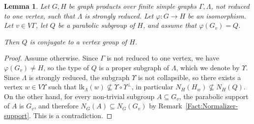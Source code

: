 \documentclass[a4paper,english,11pt]{article}
\newtheorem{lemma}[de]{Lemma}
\theoremstyle{definition}
\theoremstyle{remark}
\newcommand{\lk}{\mathrm{lk}}
\begin{document}
\begin{lemma}\label{Lmm:vertex-group-iso-strong-redution}
Let $G,H$ be graph products over finite simple graphs $\Gamma,\Lambda$, not reduced to one vertex, such that $\Lambda$ is strongly reduced. Let $\varphi:G\to H$ be an isomorphism. Let $v\in V\Gamma$, let $Q$ be a parabolic subgroup of $H$, and assume that $\varphi(G_v)=Q$.

Then $Q$ is conjugate to a vertex group of $H$.
\end{lemma}

\begin{proof}
Assume otherwise. Since $\Gamma$ is not reduced to one vertex, we have $\varphi(G_v)\neq H$, so the type of $Q$ is a proper subgraph of $\Lambda$, which we denote by $\Upsilon$. Since $\Lambda$ is strongly reduced, the subgraph $\Upsilon$ is not collapsible, so there exists a vertex $w\in V\Upsilon$ such that $\lk_\Lambda(w)\not\subseteq\Upsilon\circ \Upsilon^\perp$, in particular $N_H(H_w)\not\subseteq N_H(Q)$. On the other hand, for every non-trivial subgroup $A\subseteq G_v$, the parabolic support of $A$ is $G_v$, and therefore $N_G(A)\subseteq N_G(G_v)$ by Remark~\ref{Fact:Normalizer-support}. This is a contradiction.
\end{proof}
\end{document}
